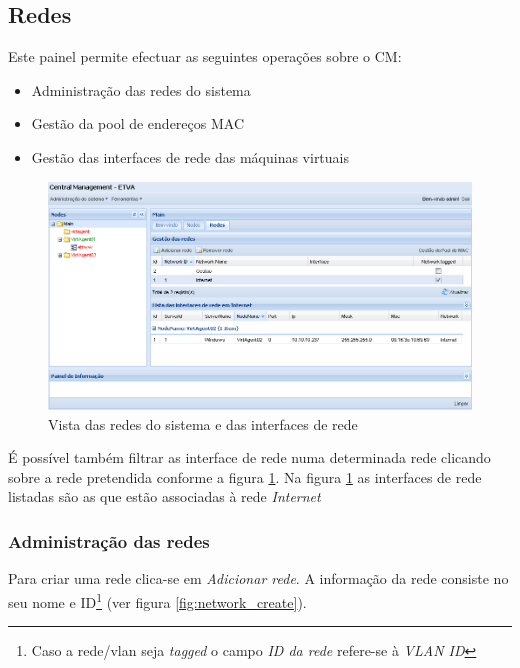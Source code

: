\subsection{Redes}

Este painel permite efectuar as seguintes operações sobre o CM:

\begin{itemize}
	\item Administração das redes do sistema
	\item Gestão da pool de endereços MAC
	\item Gestão das interfaces de rede das máquinas virtuais 
\end{itemize}

\begin{figure}[H]
	\begin{center}
	\includegraphics[scale=0.45]{screenshots/main_networks.png}
	\caption{Vista das redes do sistema  e das interfaces de rede}
	\label{fig:main_networks}
	\end{center}
\end{figure}

É possível também filtrar as interface de rede numa determinada rede clicando sobre a rede pretendida conforme a figura \ref{fig:main_networks}.
Na figura \ref{fig:main_networks} as interfaces de rede listadas são as que estão associadas à rede \emph{Internet}

\subsubsection{Administração das redes}

Para criar uma rede clica-se em \emph{Adicionar rede}.
A informação da rede consiste no seu nome e ID\footnote{Caso a rede/vlan seja \emph{tagged} o campo \emph{ID da rede} refere-se à \emph{VLAN ID}} (ver figura \ref{fig:network_create}).

